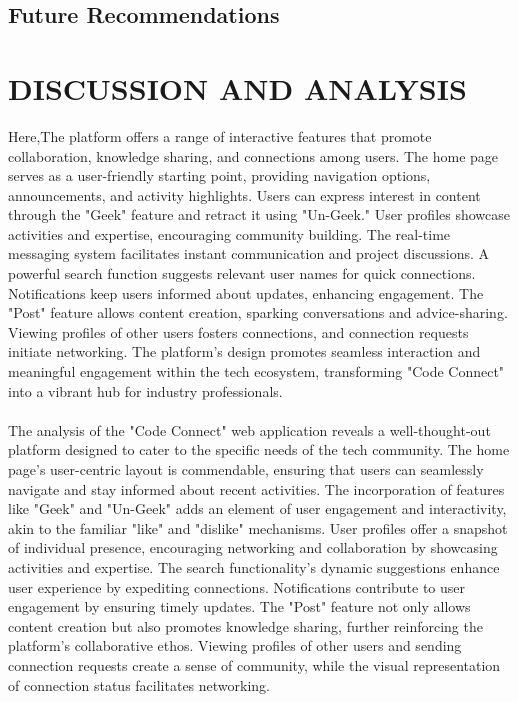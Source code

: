 \section{Future Recommendations}

\chapter{DISCUSSION AND ANALYSIS}
Here,The platform offers a range of interactive features that promote collaboration, knowledge sharing, and connections among users. The home page serves as a user-friendly starting point, providing navigation options, announcements, and activity highlights. Users can express interest in content through the "Geek" feature and retract it using "Un-Geek." User profiles showcase activities and expertise, encouraging community building. The real-time messaging system facilitates instant communication and project discussions. A powerful search function suggests relevant user names for quick connections. Notifications keep users informed about updates, enhancing engagement. The "Post" feature allows content creation, sparking conversations and advice-sharing. Viewing profiles of other users fosters connections, and connection requests initiate networking. The platform's design promotes seamless interaction and meaningful engagement within the tech ecosystem, transforming "Code Connect" into a vibrant hub for industry professionals.
\\\\
The analysis of the "Code Connect" web application reveals a well-thought-out platform designed to cater to the specific needs of the tech community. The home page's user-centric layout is commendable, ensuring that users can seamlessly navigate and stay informed about recent activities. The incorporation of features like "Geek" and "Un-Geek" adds an element of user engagement and interactivity, akin to the familiar "like" and "dislike" mechanisms. User profiles offer a snapshot of individual presence, encouraging networking and collaboration by showcasing activities and expertise. The search functionality's dynamic suggestions enhance user experience by expediting connections. Notifications contribute to user engagement by ensuring timely updates. The "Post" feature not only allows content creation but also promotes knowledge sharing, further reinforcing the platform's collaborative ethos. Viewing profiles of other users and sending connection requests create a sense of community, while the visual representation of connection status facilitates networking.
